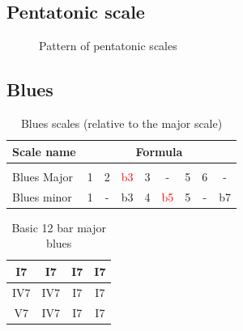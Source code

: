 \documentclass{article}
\begin{document}
\newpage
\subsection{Pentatonic scale}
\begin{figure}[h!]
	\centering
	\hspace*{-2cm}
	\scalebox{0.5}{}
	\caption{Pattern of pentatonic scales}
	\label{fig:gammme_penta_manche}
\end{figure}

\newpage
\subsection{Blues}


\begin{table}[!h]
	\caption{Blues scales (relative to the major scale)}
	\centering
	\begin{tabular}{l|cccccccc}
		Scale name  & \multicolumn{8}{c}{Formula} \\
		\hline \hline \vspace{-0.4cm} \\
		Blues Major   & 1 & 2  & \textcolor{red}{b3} & 3  &   -   & 5  & 6  &  -  \\
		Blues minor   & 1 &  - & b3 & 4  & \textcolor{red}{b5} &  5  & - &  b7 \\
	\end{tabular}
	\label{tab: }
\end{table}

\begin{table}[!h]
	\caption{Basic 12 bar major blues}
	\centering
	\begin{tabular}{| c | c | c | c |}
		\hline
		\phantom{x}I7\phantom{x} & \phantom{x}I7\phantom{x} & \phantom{x}I7\phantom{x} & \phantom{x}I7\phantom{x}  \\
		\hline
		\phantom{x}IV7\phantom{x} & \phantom{x}IV7\phantom{x} & \phantom{x}I7\phantom{x} & \phantom{x}I7\phantom{x}  \\
		\hline
		\phantom{x}V7\phantom{x} & \phantom{x}IV7\phantom{x} & \phantom{x}I7\phantom{x} & \phantom{x}I7\phantom{x}  \\
		\hline
	\end{tabular}
	\label{tab: }
\end{table}
\end{document}

